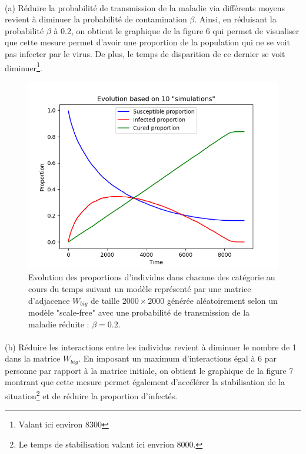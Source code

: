 \documentclass[a4paper, 12pt, oneside]{article}
\begin{document}
\paragraph{}(a) Réduire la probabilité de transmission de la maladie via différents moyens revient à diminuer la probabilité de contamination $\beta$. Ainsi, en réduisant la probabilité $\beta$ à 0.2, on obtient le graphique de la figure 6 qui permet de visualiser que cette mesure permet d'avoir une proportion de la population qui ne se voit pas infecter par le virus. De plus, le temps de disparition de ce dernier se voit diminuer\footnote{Valant ici environ 8300}.

\begin{figure}[H]
	\centering
	\includegraphics[scale=1]{Wbig_dense_reduction_transmission.png} 
	\caption{Evolution des proportions d'individus dans chacune des catégorie au cours du temps suivant un modèle représenté par une matrice d'adjacence $W_{big}$ de taille $2000 \times 2000$ générée aléatoirement selon un modèle "scale-free" avec une probabilité de transmission de la maladie réduite : $\beta = 0.2$.}
\end{figure}


\paragraph{}(b) Réduire les interactions entre les individus revient à diminuer le nombre de 1 dans la matrice $W_{big}$. En imposant un maximum d'interactions égal à 6 par personne par rapport à la matrice initiale, on obtient le graphique de la figure 7 montrant que cette mesure permet également d'accélérer la stabilisation de la situation\footnote{Le temps de stabilisation valant ici envrion 8000.} et de réduire la proportion d'infectés.
\end{document}
